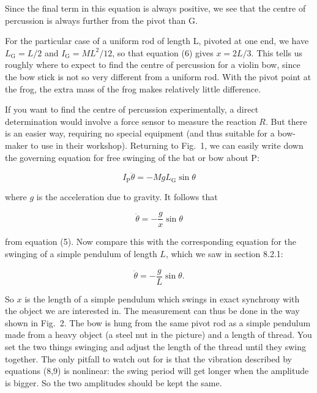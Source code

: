   Since the final term in this equation is always positive, we see that the 
  centre of percussion is always further from the pivot than G. 

  For the particular case of a uniform rod of length L, pivoted at one end, we 
  have $L_{\mathrm{G}}=L/2$ and $I_{\mathrm{G}}=ML^2/12$, so that equation (6) 
  gives $x=2L/3$. This tells us roughly where to expect to find the centre of 
  percussion for a violin bow, since the bow stick is not so very different 
  from a uniform rod. With the pivot point at the frog, the extra mass of the 
  frog makes relatively little difference. 

  If you want to find the centre of percussion experimentally, a direct 
  determination would involve a force sensor to measure the reaction $R$. But 
  there is an easier way, requiring no special equipment (and thus suitable for 
  a bow-maker to use in their workshop). Returning to Fig.\ 1, we can easily 
  write down the governing equation for free swinging of the bat or bow about 
  P: 

  $$I_{\mathrm{P}} \ddot{\theta} = -MgL_{\mathrm{G}} \sin\theta \tag{7}$$ 

  where $g$ is the acceleration due to gravity. It follows that 

  $$\ddot{\theta} =-\frac{g}{x} \sin \theta \tag{8}$$ 

  from equation (5). Now compare this with the corresponding equation for the 
  swinging of a simple pendulum of length $L$, which we saw in section 8.2.1: 

  $$\ddot{\theta} =-\frac{g}{L} \sin \theta. \tag{9}$$ 

  So $x$ is the length of a simple pendulum which swings in exact synchrony 
  with the object we are interested in. The measurement can thus be done in the 
  way shown in Fig.\ 2. The bow is hung from the same pivot rod as a simple 
  pendulum made from a heavy object (a steel nut in the picture) and a length 
  of thread. You set the two things swinging and adjust the length of the 
  thread until they swing together. The only pitfall to watch out for is that 
  the vibration described by equations (8,9) is nonlinear: the swing period 
  will get longer when the amplitude is bigger. So the two amplitudes should be 
  kept the same. 

